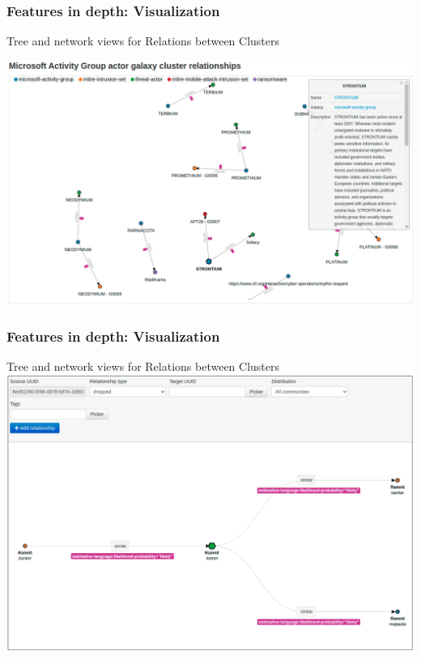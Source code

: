 \begin{frame}
    \frametitle{Features in depth: Visualization}
    Tree and network views for Relations between Clusters
    \vspace{0.5em}
    \begin{center}
        \includegraphics[width=1.0\linewidth]{pics/cluster-relations}
    \end{center}
\end{frame}

\begin{frame}
    \frametitle{Features in depth: Visualization}
    Tree and network views for Relations between Clusters
    \includegraphics[width=1.0\linewidth]{pics/cluster-relations-tree}
\end{frame}

